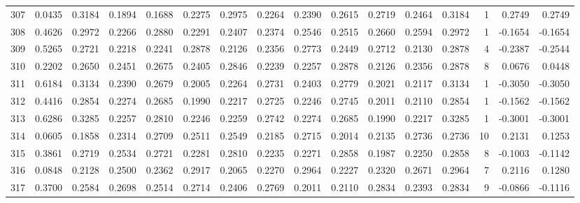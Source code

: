 \begin{tabular}{lrrrrrrrrrrrrrrr}
307 &      0.0435 &  0.3184 &  0.1894 &  0.1688 &  0.2275 &  0.2975 &  0.2264 &  0.2390 &  0.2615 &  0.2719 &   0.2464 &     0.3184 &      1 &                    0.2749 &                     0.2749 \\
308 &      0.4626 &  0.2972 &  0.2266 &  0.2880 &  0.2291 &  0.2407 &  0.2374 &  0.2546 &  0.2515 &  0.2660 &   0.2594 &     0.2972 &      1 &                   -0.1654 &                    -0.1654 \\
309 &      0.5265 &  0.2721 &  0.2218 &  0.2241 &  0.2878 &  0.2126 &  0.2356 &  0.2773 &  0.2449 &  0.2712 &   0.2130 &     0.2878 &      4 &                   -0.2387 &                    -0.2544 \\
310 &      0.2202 &  0.2650 &  0.2451 &  0.2675 &  0.2405 &  0.2846 &  0.2239 &  0.2257 &  0.2878 &  0.2126 &   0.2356 &     0.2878 &      8 &                    0.0676 &                     0.0448 \\
311 &      0.6184 &  0.3134 &  0.2390 &  0.2679 &  0.2005 &  0.2264 &  0.2731 &  0.2403 &  0.2779 &  0.2021 &   0.2117 &     0.3134 &      1 &                   -0.3050 &                    -0.3050 \\
312 &      0.4416 &  0.2854 &  0.2274 &  0.2685 &  0.1990 &  0.2217 &  0.2725 &  0.2246 &  0.2745 &  0.2011 &   0.2110 &     0.2854 &      1 &                   -0.1562 &                    -0.1562 \\
313 &      0.6286 &  0.3285 &  0.2257 &  0.2810 &  0.2246 &  0.2259 &  0.2742 &  0.2274 &  0.2685 &  0.1990 &   0.2217 &     0.3285 &      1 &                   -0.3001 &                    -0.3001 \\
314 &      0.0605 &  0.1858 &  0.2314 &  0.2709 &  0.2511 &  0.2549 &  0.2185 &  0.2715 &  0.2014 &  0.2135 &   0.2736 &     0.2736 &     10 &                    0.2131 &                     0.1253 \\
315 &      0.3861 &  0.2719 &  0.2534 &  0.2721 &  0.2281 &  0.2810 &  0.2235 &  0.2271 &  0.2858 &  0.1987 &   0.2250 &     0.2858 &      8 &                   -0.1003 &                    -0.1142 \\
316 &      0.0848 &  0.2128 &  0.2500 &  0.2362 &  0.2917 &  0.2065 &  0.2270 &  0.2964 &  0.2227 &  0.2320 &   0.2671 &     0.2964 &      7 &                    0.2116 &                     0.1280 \\
317 &      0.3700 &  0.2584 &  0.2698 &  0.2514 &  0.2714 &  0.2406 &  0.2769 &  0.2011 &  0.2110 &  0.2834 &   0.2393 &     0.2834 &      9 &                   -0.0866 &                    -0.1116 \\

\end{tabular}
